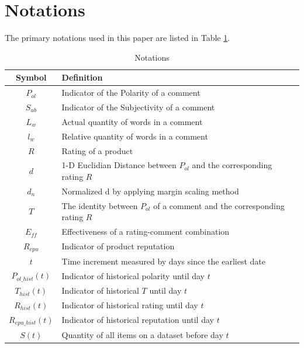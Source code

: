 \documentclass[12pt]{article}  %
\begin{document}
\section{Notations}
The primary notations used in this paper are listed in Table \ref{tb:notation}.
\begin{table}[H]
\begin{center}
\caption{Notations}
\begin{tabular}{cl}
	\toprule
	\multicolumn{1}{m{3cm}}{\centering Symbol}
	&\multicolumn{1}{m{12cm}}{Definition}\\
	\midrule
  $P_{ol}$&Indicator of the Polarity of a comment\\

$S_{ub}$&Indicator of the Subjectivity of a comment\\

$L_{w}$&Actual quantity of words in a comment\\

$l_{w}$&Relative quantity of words in a comment\\

${R}$&Rating of a product\\

$d$&1-D Euclidian Distance between $P_{ol}$ and the corresponding rating ${R}$\\

$d_{n}$&Normalized d by applying margin scaling method\\

$T$&The identity between $P_{ol}$ of a comment and the corresponding rating ${R}$\\

  $E_{ff}$&Effectiveness of a rating-comment combination\\
  $R_{epu}$&Indicator of product reputation\\

$t$&Time increment measured by days since the earliest date\\

$P_{ol\_hist}(t)$&Indicator of historical polarity until day $t$\\

$T_{hist}(t)$&Indicator of historical $T$ until day $t$\\

$R_{hist}(t)$&Indicator of historical rating until day $t$\\

$R_{epu\_hist}(t)$&Indicator of historical reputation until day $t$\\

$S(t)$&Quantity of all items on a dataset before day $t$\\
	\bottomrule
\end{tabular}\label{tb:notation}
\end{center}
\end{table}
\end{document}
